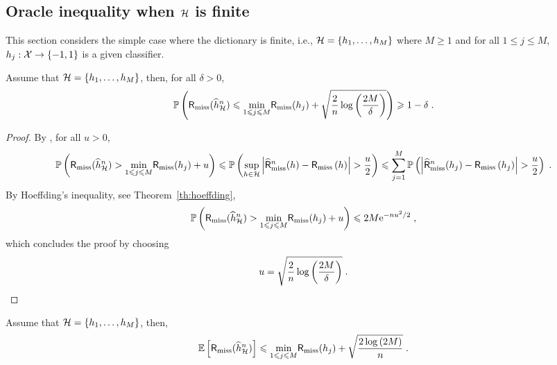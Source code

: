 \subsection*{Oracle inequality when $\mathcal{H}$ is finite}
This section considers the simple case where the dictionary is finite, i.e., $\mathcal{H} = \{h_1,\ldots,h_M\}$ where $M\geqslant 1$ and for all $1\leqslant j\leqslant M$, $h_j:\mathcal{X} \to\{-1,1\}$ is a given classifier.

\begin{shaded}
\begin{proposition}
\label{prop:oracle:finite:prob}
Assume that  $\mathcal{H} = \{h_1,\ldots,h_M\}$, then, for all $\delta>0$,
\[
\mathbb{P}\left(\mathsf{R}_{\mathrm{miss}}(\widehat h^n_{\mathcal{H}}) \leqslant \underset{1\leqslant j \leqslant M}{\min}\mathsf{R}_{\mathrm{miss}}(h_j) + \sqrt{\frac{2}{n}\log\left(\frac{2M}{\delta}\right)}\right)\geqslant 1-\delta\;.
\]
\end{proposition}
\end{shaded}
\begin{proof}
By , for all $u>0$,
\[
\mathbb{P}\left(\mathsf{R}_{\mathrm{miss}}(\widehat h^n_{\mathcal{H}}) > \underset{1\leqslant j \leqslant M}{\min}\mathsf{R}_{\mathrm{miss}}(h_j) + u\right) \leqslant \mathbb{P}\left( \underset{h\in\mathcal{H}}{\sup}\left|\widehat {\mathsf{R}}^n_{\mathrm{miss}}(h) - \mathsf{R}_{\mathrm{miss}}\left(h\right)\right|  > \frac{u}{2}\right) \leqslant \sum_{j=1}^M  \mathbb{P}\left(\left|\widehat {\mathsf{R}}^n_{\mathrm{miss}}(h_j) - \mathsf{R}_{\mathrm{miss}}\left(h_j\right)\right|  > \frac{u}{2}\right)\;.
\]
By Hoeffding's inequality, see Theorem~\ref{th:hoeffding},
\[
\mathbb{P}\left(\mathsf{R}_{\mathrm{miss}}(\widehat h^n_{\mathcal{H}}) > \underset{1\leqslant j \leqslant M}{\min}\mathsf{R}_{\mathrm{miss}}(h_j) + u\right) \leqslant 2M\mathrm{e}^{-nu^2/2}\;,
\]
which concludes the proof by choosing
\[
u = \sqrt{\frac{2}{n}\log\left(\frac{2M}{\delta}\right)}\;.
\]
\end{proof}

\begin{shaded}
\begin{proposition}
\label{prop:oracle:finite:expectation}
Assume that  $\mathcal{H} = \{h_1,\ldots,h_M\}$, then,
\[
\mathbb{E}\left[\mathsf{R}_{\mathrm{miss}}(\widehat h^n_{\mathcal{H}})\right] \leqslant \underset{1\leqslant j \leqslant M}{\min}\mathsf{R}_{\mathrm{miss}}(h_j) + \sqrt{\frac{2\log\left(2M\right)}{n}}\;.
\]
\end{proposition}
\end{shaded}



